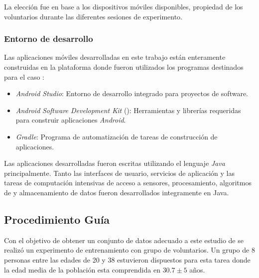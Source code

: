 La elección fue en base a los dispositivos móviles disponibles, propiedad
de los voluntarios durante las diferentes sesiones de experimento.

\subsubsection{Entorno de desarrollo }

Las aplicaciones móviles desarrolladas en este trabajo están enteramente
construidas en la plataforma \emph{} donde fueron utilizados
los programas destinados para el caso \cite{Android2016}:
\begin{itemize}
\item \emph{Android Studio}: Entorno de desarrollo integrado para proyectos\emph{
}de software.
\item \emph{Android} \emph{Software Development Kit }(): Herramientas
y librerías  requeridas para construir aplicaciones \emph{Android}.
\item \emph{Gradle}: Programa de automatización de tareas de construcción
de aplicaciones.
\end{itemize}
Las aplicaciones desarrolladas fueron escritas utilizando el lenguaje
\emph{Java }principalmente. Tanto las interfaces de usuario, servicios
de aplicación y las tareas de computación intensivas de acceso a sensores,
procesamiento, algoritmos de  y almacenamiento de datos
fueron desarrollados integramente en Java.

\subsection{Procedimiento Guía }

Con el objetivo de obtener un conjunto de datos adecuado a este estudio
de  se realizó un experimento de entrenamiento con grupo
de voluntarios. Un grupo de 8 personas entre las edades de 20 y 38
estuvieron dispuestos para esta tarea donde la edad media de la población
esta comprendida en $30.7\pm5$ años. 

